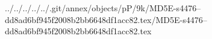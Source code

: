 ../../../../../.git/annex/objects/pP/9k/MD5E-s4476--dd8ad6bf945f2008b2bb6648df1acc82.tex/MD5E-s4476--dd8ad6bf945f2008b2bb6648df1acc82.tex